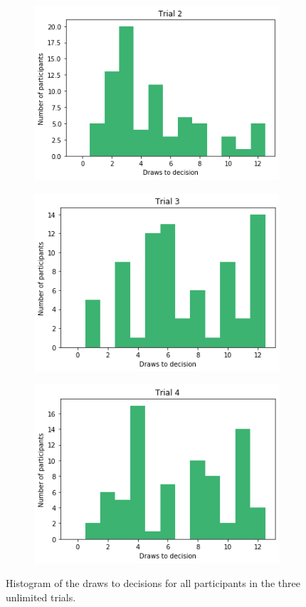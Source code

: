 \begin{figure}
    \centering
    \begin{subfigure}{0.48\textwidth}
        \includegraphics[scale=0.38]{pictures/dtd2_histogram.png}
    \end{subfigure}
    \hfill
    \begin{subfigure}{0.48\textwidth}
        \includegraphics[scale=0.38]{pictures/dtd3_histogram.png}
    \end{subfigure}
    \vfill
    \begin{subfigure}{0.48\textwidth}
        \includegraphics[scale=0.38]{pictures/dtd4_histogram.png}
    \end{subfigure}
    \caption[Draws to decision in the unlimited trials]{Histogram of the draws to decisions for all participants in the three unlimited trials.}
    \label{fig:dtd_unlimited_trials}
\end{figure}



